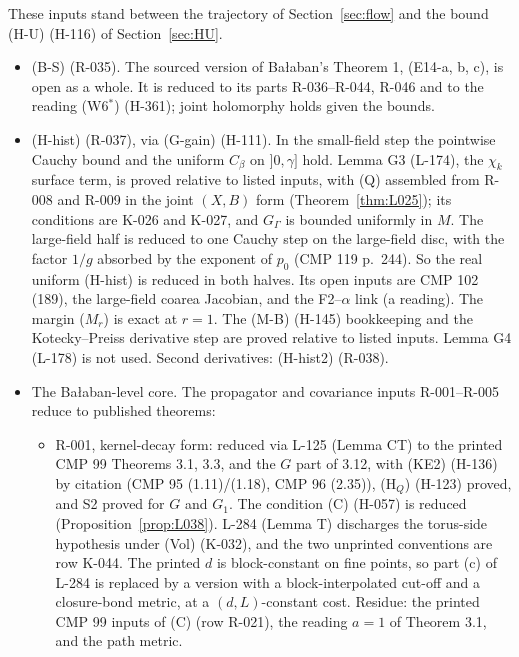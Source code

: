 These inputs stand between the trajectory of Section~\ref{sec:flow} and the bound (H-U) (H-116) of Section~\ref{sec:HU}.
\begin{itemize}
\item (B-S) (R-035). The sourced version of Ba{\l}aban's Theorem 1, (E14-a, b, c), is open as a whole. It is reduced to its parts R-036--R-044, R-046 and to the reading (W6$^*$) (H-361); joint holomorphy holds given the bounds.
\item (H-hist) (R-037), via (G-gain) (H-111). In the small-field step the pointwise Cauchy bound and the uniform $C_\beta$ on $]0,\gamma]$ hold. Lemma G3 (L-174), the $\chi_k$ surface term, is proved relative to listed inputs, with (Q) assembled from R-008 and R-009 in the joint $(X,B)$ form (Theorem~\ref{thm:L025}); its conditions are K-026 and K-027, and $G_\Gamma$ is bounded uniformly in $M$. The large-field half is reduced to one Cauchy step on the large-field disc, with the factor $1/g$ absorbed by the exponent of $p_0$ (CMP 119 p.\ 244). So the real uniform (H-hist) is reduced in both halves. Its open inputs are CMP 102 (189), the large-field coarea Jacobian, and the F2--$\alpha$ link (a reading). The margin ($M_r$) is exact at $r=1$. The (M-B) (H-145) bookkeeping and the Kotecky--Preiss derivative step are proved relative to listed inputs. Lemma G4 (L-178) is not used. Second derivatives: (H-hist2) (R-038).
\item The Ba{\l}aban-level core. The propagator and covariance inputs R-001--R-005 reduce to published theorems:
\begin{itemize}
\item R-001, kernel-decay form: reduced via L-125 (Lemma CT) to the printed CMP 99 Theorems 3.1, 3.3, and the $G$ part of 3.12, with (KE2) (H-136) by citation (CMP 95 (1.11)/(1.18), CMP 96 (2.35)), (H$_Q$) (H-123) proved, and S2 proved for $G$ and $G_1$. The condition (C) (H-057) is reduced (Proposition~\ref{prop:L038}). L-284 (Lemma T) discharges the torus-side hypothesis under (Vol) (K-032), and the two unprinted conventions are row K-044. The printed $d$ is block-constant on fine points, so part (c) of L-284 is replaced by a version with a block-interpolated cut-off and a closure-bond metric, at a $(d,L)$-constant cost. Residue: the printed CMP 99 inputs of (C) (row R-021), the reading $a=1$ of Theorem 3.1, and the path metric.

\end{itemize}
\end{itemize}
